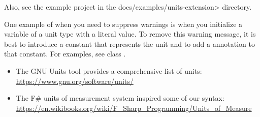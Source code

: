 Also, see the example project in the \<docs/examples/units-extension> directory.




One example of when you need to suppress warnings is when you
initialize a variable of a unit type with a literal value.
To remove this warning message, it is best to introduce a
constant that represents the unit and to
add a 
annotation to that constant.
For examples, see class .



\begin{itemize}
\item The GNU Units tool provides a comprehensive list of units:\\
  \url{https://www.gnu.org/software/units/}

\item The F\# units of measurement system inspired some of our syntax:\\
  \url{https://en.wikibooks.org/wiki/F_Sharp_Programming/Units_of_Measure}

\end{itemize}

